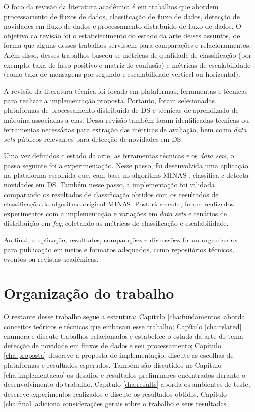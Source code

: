 O foco da revisão da literatura acadêmica é em trabalhos que abordem
processamento de fluxos de dados, classificação de fluxo de dados, detecção de
novidades em fluxo de dados e processamento distribuído de fluxo de dados.
O objetivo da revisão foi o estabelecimento do estado da arte desses assuntos,
de forma que alguns desses trabalhos servissem para comparações e relacionamentos.
Além disso, desses trabalhos buscou-se métricas de qualidade de classificação
(por exemplo, taxa de falso positivo e matriz de confusão) e métricas de
escalabilidade (como taxa de mensagens por segundo e escalabilidade vertical ou
horizontal).

A revisão da literatura técnica foi focada em plataformas, ferramentas e técnicas
para realizar a implementação proposta.
Portanto, foram selecionadas plataformas de processamento distribuído de DS
e técnicas de aprendizado de máquina associadas a elas.
Dessa revisão também foram identificadas técnicas ou ferramentas necessárias
para extração das métricas de avaliação, bem como \emph{data sets}
públicos relevantes para detecção de novidades em DS.

Uma vez definidos o estado da arte, as ferramentas técnicas e os
\emph{data sets}, o passo seguinte foi a experimentação.
Nesse passo, foi desenvolvida uma aplicação na plataforma escolhida que, com base no
algoritmo MINAS \cite{Faria2016minas}, classifica e detecta novidades em DS.
Também nesse passo, a implementação foi validada comparando os resultados de
classificação obtidos com os resultados de classificação do algoritmo original
MINAS.
Posteriormente, foram realizados experimentos com a implementação e variações em \emph{data sets} e
cenários de distribuição em \emph{fog}, coletando as métricas de classificação e escalabilidade.

Ao final, a aplicação, resultados, comparações e discussões foram organizados para publicação 
em meios e formatos adequados, como repositórios técnicos, eventos ou revistas
acadêmicas.

\section{Organização do trabalho}

O restante desse trabalho segue a estrutura:
Capítulo \ref{cha:fundamentos} aborda conceitos teóricos e técnicos que embasam
esse trabalho;
Capítulo \ref{cha:related} enumera e discute trabalhos relacionados e estabelece
o estado da arte do tema detecção de novidade em fluxos de dados e seu
processamento;
Capítulo \ref{cha:proposta} descreve a proposta de implementação, discute as
escolhas de plataformas e resultados esperados.
Também são discutidos no Capítulo \ref{cha:implementacao} os desafios e
resultados preliminares encontrados durante o desenvolvimento do trabalho.
Capítulo \ref{cha:results} aborda os ambientes de teste, descreve experimentos
realizados e discute os resultados obtidos.
Capítulo \ref{cha:final} adiciona considerações gerais sobre o trabalho e seus
resultados.

